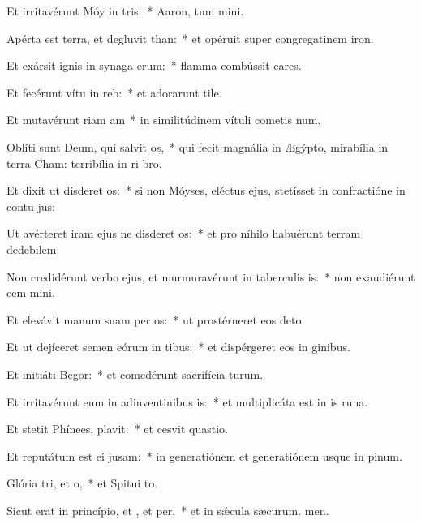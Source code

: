 \item Et irritavérunt Móy in tris:~* Aaron, tum mini.
\item Apérta est terra, et degluvit than:~* et opéruit super congregatinem iron.
\item Et exársit ignis in synaga erum:~* flamma combússit cares.
\item Et fecérunt vítu in reb:~* et adorarunt tile.
\item Et mutavérunt riam am~* in similitúdinem vítuli cometis num.
\item Oblíti sunt Deum, qui salvit os,~* qui fecit magnália in Ægýpto, mirabília in terra Cham: terribília in ri bro.
\item Et dixit ut disderet os:~* si non Móyses, eléctus ejus, stetísset in confractióne in contu jus:
\item Ut avérteret iram ejus ne disderet os:~* et pro níhilo habuérunt terram dedebilem:
\item Non credidérunt verbo ejus, et murmuravérunt in taberculis is:~* non exaudiérunt cem mini.
\item Et elevávit manum suam per os:~* ut prostérneret eos  deto:
\item Et ut dejíceret semen eórum in tibus:~* et dispérgeret eos in ginibus.
\item Et initiáti  Begor:~* et comedérunt sacrifícia turum.
\item Et irritavérunt eum in adinventinibus is:~* et multiplicáta est in is runa.
\item Et stetit Phínees,  plavit:~* et cesvit quastio.
\item Et reputátum est ei  jusam:~* in generatiónem et generatiónem usque in pinum.
\item Glória tri, et o,~* et Spitui to.
\item Sicut erat in princípio, et , et per,~* et in sǽcula sæcurum. men.
